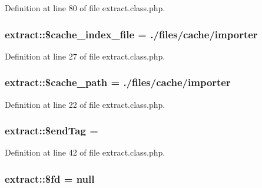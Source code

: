 Definition at line 80 of file extract.\+class.\+php.

\subsubsection[{\texorpdfstring{\$cache\+\_\+index\+\_\+file}{$cache_index_file}}]{\setlength{\rightskip}{0pt plus 5cm}extract\+::\$cache\+\_\+index\+\_\+file = \textquotesingle{}./{\bf files}/cache/{\bf importer}\textquotesingle{}}\hypertarget{classextract_a6bd40f89eeb4e608723a39f5824d0c1e}{}\label{classextract_a6bd40f89eeb4e608723a39f5824d0c1e}


Definition at line 27 of file extract.\+class.\+php.

\subsubsection[{\texorpdfstring{\$cache\+\_\+path}{$cache_path}}]{\setlength{\rightskip}{0pt plus 5cm}extract\+::\$cache\+\_\+path = \textquotesingle{}./{\bf files}/cache/{\bf importer}\textquotesingle{}}\hypertarget{classextract_a00f1309c1e975d137a9f17ad9afc5d1e}{}\label{classextract_a00f1309c1e975d137a9f17ad9afc5d1e}


Definition at line 22 of file extract.\+class.\+php.

\subsubsection[{\texorpdfstring{\$end\+Tag}{$endTag}}]{\setlength{\rightskip}{0pt plus 5cm}extract\+::\$end\+Tag = \textquotesingle{}\textquotesingle{}}\hypertarget{classextract_a46190b1f23addca9726e18aa15929c2a}{}\label{classextract_a46190b1f23addca9726e18aa15929c2a}


Definition at line 42 of file extract.\+class.\+php.

\subsubsection[{\texorpdfstring{\$fd}{$fd}}]{\setlength{\rightskip}{0pt plus 5cm}extract\+::\$fd = {\bf null}}\hypertarget{classextract_ae21a224916b245a23dd69139f58c81ed}{}\label{classextract_ae21a224916b245a23dd69139f58c81ed}


